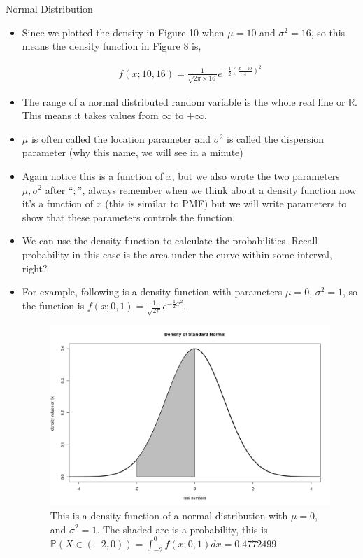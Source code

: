 \documentclass[8pt, usepdftitle=false]{beamer}
\begin{document}
\begin{frame}[allowframebreaks]{Normal Distribution}
\begin{itemize}
\item Since we plotted the density in Figure 10 when $\mu = 10$ and $\sigma^2 = 16$, so this means the density function in Figure 8 is, 

\begin{align*}
f(x; 10, 16) = \frac{1}{\sqrt{2 \pi \times 16}} e^{-\frac{1}{2}\left(\frac{x-10}{4}\right)^2}
\end{align*} 


\item   The range of a normal distributed random variable is the whole real line or $\mathbb{R}$. This means it takes values from $\infty$ to $+\infty$. 


\item $\mu$ is often called the \alert{location} parameter and $\sigma^2$ is called the \alert{dispersion} parameter (why this name, we will see in a minute)


\item Again notice this is a function of $x$, but we also wrote the two parameters $\mu, \sigma^2$ after ``$;$'', always remember when we think about a density function now it's a function of $x$ (this is similar to PMF) but we will write parameters to show that these parameters controls the function. 


\item We can use the density function to calculate the probabilities. Recall probability in this case is the area under the curve within some interval, right?

\item For example, following is a density function with parameters $\mu = 0$, $\sigma^2 =1$, so the function is   $f(x; 0, 1) = \frac{1}{\sqrt{2 \pi}} e^{-\frac{1}{2}x^2}$.


\begin{figure}
\centering
\includegraphics[scale = .25]{Images/Normal_density_area.png}
\caption{This is a density function of a normal distribution with $\mu = 0$, and $\sigma^2 = 1$. The shaded are is a probability, this is $\mathbb{P}(X \in(-2,0))=\int_{-2}^0 f(x; 0, 1) d x=0.4772499$}
\end{figure}





\end{itemize}
\end{frame}
\end{document}
